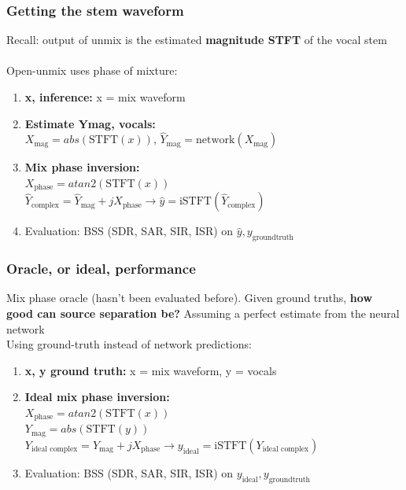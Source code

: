 \documentclass[usenames,dvipsnames]{beamer}
\begin{document}
\begin{frame}
	\frametitle{Getting the stem waveform}
	Recall: output of unmix is the estimated \textbf{magnitude STFT} of the vocal stem\\\ \\

	Open-unmix uses phase of mixture:
	\begin{enumerate}
		\item
			\textbf{x, inference:} x = mix waveform
		\item
			\textbf{Estimate Ymag, vocals:}\\
			\qquad $X_{\text{mag}} = abs(\text{STFT}(x))$, $\hat{Y}_{\text{mag}} = \text{network}(X_{\text{mag}})$
		\item
			\textbf{Mix phase inversion:}\\
			\qquad $X_{\text{phase}} = atan2(\text{STFT}(x))$\\
			\qquad $\hat{Y}_{\text{complex}} = \hat{Y}_{\text{mag}} + j X_{\text{phase}} \rightarrow \hat{y} = \text{iSTFT}(\hat{Y}_{\text{complex}})$
		\item
			Evaluation: BSS (SDR, SAR, SIR, ISR) on $\hat{y}, y_{\text{groundtruth}}$
	\end{enumerate}
\end{frame}

\begin{frame}
	\frametitle{Oracle, or ideal, performance}
	Mix phase oracle (hasn't been evaluated before). Given ground truths, \textbf{how good can source separation be?} Assuming a perfect estimate from the neural network\\

	Using ground-truth instead of network predictions:
	\begin{enumerate}
		\item
			\textbf{x, y ground truth:} x = mix waveform, y = vocals
		\item
			\textbf{Ideal mix phase inversion:}\\
			\qquad $X_{\text{phase}} = atan2(\text{STFT}(x))$\\
			\qquad $Y_{\text{mag}} = abs(\text{STFT}(y))$\\
			\qquad $Y_{\text{ideal complex}} = Y_{\text{mag}} + j X_{\text{phase}} \rightarrow y_{\text{ideal}} = \text{iSTFT}(Y_{\text{ideal complex}})$
		\item
			Evaluation: BSS (SDR, SAR, SIR, ISR) on $y_{\text{ideal}}, y_{\text{groundtruth}}$
	\end{enumerate}
\end{frame}
\end{document}
